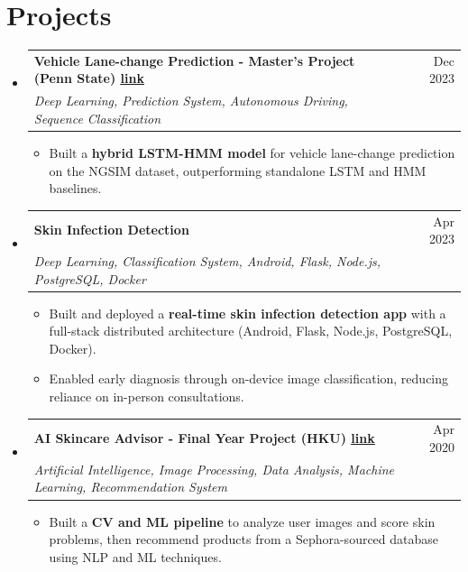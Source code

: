 \documentclass[a4paper,10pt]{article}
\makeatletter
\newcommand{\resumeItem}[1]{
  \item\small{
    {#1 \vspace{-2pt}}
  }
}
\newcommand{\resumeSubheading}[4]{
  \vspace{-2pt}\item
    \begin{tabular*}{0.97\textwidth}[t]{l@{\extracolsep{\fill}}r}
      \textbf{#1} & #2 \\
      \textit{\small#3} & \textit{\small #4} \\
    \end{tabular*}\vspace{-7pt}
}
\newcommand{\resumeSubHeadingListStart}{\begin{itemize}[leftmargin=0.15in, label={}]}
\newcommand{\resumeSubHeadingListEnd}{\end{itemize}}
\newcommand{\resumeItemListStart}{\begin{itemize}}
\newcommand{\resumeItemListEnd}{\end{itemize}\vspace{-5pt}}
\makeatother
\begin{document}


\section{Projects}
  \resumeSubHeadingListStart
    \resumeSubheading
    {Vehicle Lane-change Prediction - Master's Project (Penn State) \; \href{https://github.com/mahmad97/Vehicle-Lane-Change-Prediction-using-LSTMHMM}{\underline{link}}}{Dec 2023}
    {Deep Learning, Prediction System, Autonomous Driving, Sequence Classification}{}
    \resumeItemListStart
      \resumeItem{Built a \textbf{hybrid LSTM-HMM model} for vehicle lane-change prediction on the NGSIM dataset, outperforming standalone LSTM and HMM baselines.}
    \resumeItemListEnd

    \resumeSubheading
    {Skin Infection Detection}{Apr 2023}
    {Deep Learning, Classification System, Android, Flask, Node.js, PostgreSQL, Docker}{}
    \resumeItemListStart
      \resumeItem{Built and deployed a \textbf{real-time skin infection detection app} with a full-stack distributed architecture (Android, Flask, Node.js, PostgreSQL, Docker).}
      \resumeItem{Enabled early diagnosis through on-device image classification, reducing reliance on in-person consultations.}
    \resumeItemListEnd

    \resumeSubheading
    {AI Skincare Advisor - Final Year Project (HKU) \; \href{https://github.com/mahmad97/AI_skincare_advisor}{\underline{link}}}{Apr 2020}
    {Artificial Intelligence, Image Processing, Data Analysis, Machine Learning, Recommendation System}{}
    \resumeItemListStart
      \resumeItem{Built a \textbf{CV and ML pipeline} to analyze user images and score skin problems, then recommend products from a Sephora-sourced database using NLP and ML techniques.}
    \resumeItemListEnd
  \resumeSubHeadingListEnd
\end{document}
